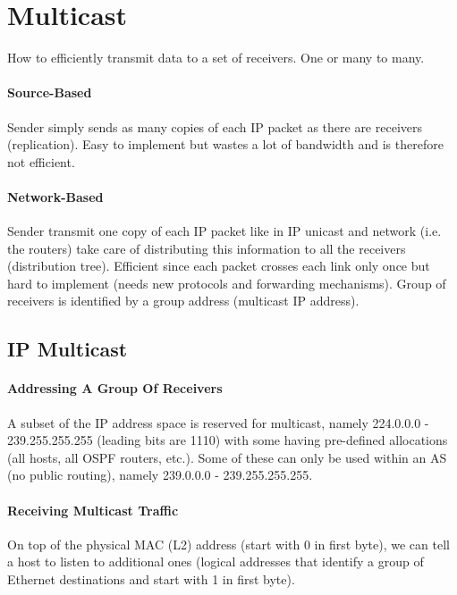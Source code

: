 \section{Multicast}

How to efficiently transmit data to a set of receivers. One or many to many.

\paragraph{Source-Based}
Sender simply sends as many copies of each IP packet as there are receivers (replication). Easy to implement but wastes a lot of bandwidth and is therefore not efficient.

\paragraph{Network-Based}
Sender transmit one copy of each IP packet like in IP unicast and network (i.e. the routers) take care of distributing this information to all the receivers (distribution tree). Efficient since each packet crosses each link only once but hard to implement (needs new protocols and forwarding mechanisms). Group of receivers is identified by a group address (multicast IP address).

\subsection{IP Multicast}


\paragraph{Addressing A Group Of Receivers}
A subset of the IP address space is reserved for multicast, namely 224.0.0.0 - 239.255.255.255 (leading bits are 1110) with some having pre-defined allocations (all hosts, all OSPF routers, etc.). Some of these can only be used within an AS (no public routing), namely 239.0.0.0 - 239.255.255.255.

\paragraph{Receiving Multicast Traffic}
On top of the physical MAC (L2) address (start with 0 in first byte), we can tell a host to listen to additional ones (logical addresses that identify a group of Ethernet destinations and start with 1 in first byte).

